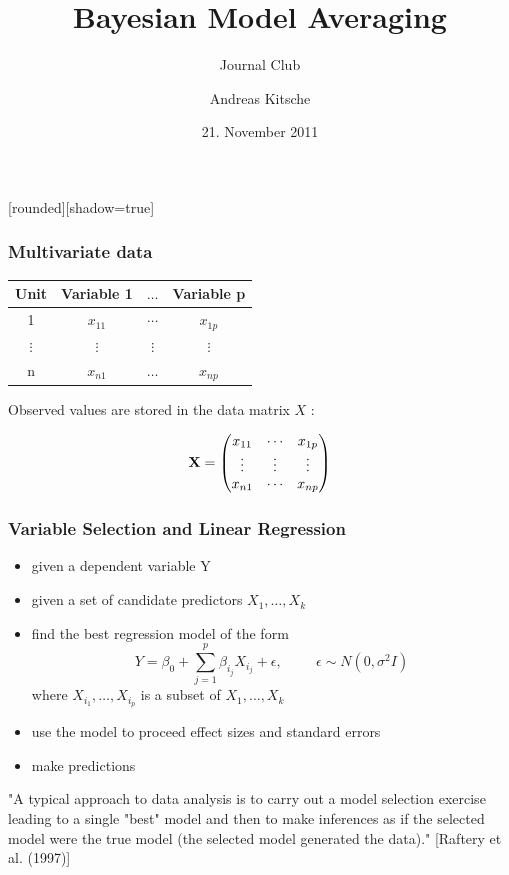 \documentclass[hyperref={pdfpagelabels=true}]{beamer}
\title{Bayesian Model Averaging}
\subtitle{Journal Club}
\institute[Institut für Biostatistik]{Institut für Biostatistik\\ \url{kitsche@biostat.uni-hannover.de}}
\author{Andreas Kitsche}
\date{21. November 2011}
\begin{document}

[rounded][shadow=true]
\addtocounter{framenumber}{-1}

\begin{frame}
\titlepage
\end{frame}






\begin{frame}
\frametitle{Multivariate data}
\begin{table}
	\centering
		\begin{tabular}{cccc} \hline
		Unit & Variable 1 & $\ldots$ & Variable p\\ \hline
		1 & $x_{11}$ & $\cdots$ & $x_{1p}$\\
		$\vdots$ & $\vdots$ & $\vdots$ & $\vdots$ \\
		n&$x_{n1}$ & $\ldots$ & $x_{np}$ \\ \hline
		\end{tabular}
\end{table}
Observed values are stored in the data matrix  \boldmath$X$ \unboldmath:

\begin{align*}
\bf X = \begin{pmatrix}
x_{11} &  \cdots & x_{1p}\\
\vdots & \vdots &\vdots  \\ 
x_{n1} & \cdots & x_{np}
\end{pmatrix}
\end{align*}

\nocite{Genell.2010}
\nocite{Raftery.1997}
\nocite{Hoeting.2000}
\nocite{Clyde.1999}
\nocite{PENROSE.1985}

\end{frame}

\begin{frame}
\frametitle{Variable Selection and Linear Regression}
\begin{itemize}
\item given a dependent variable Y
\item given a set of candidate predictors $X_{1},\ldots,X_{k}$
\item find the best regression model of the form
\[
Y = \beta_{0} + \sum_{j=1}^{p}\beta_{i_{j}}X_{i_{j}} + \epsilon, \hspace{1cm} \epsilon \sim N(0, \sigma^{2}I)
\]
where $X_{i_{1}},\ldots,X_{i_{p}}$ is a subset of $X_{1},\ldots,X_{k}$\\
\item use the model to proceed effect sizes and standard errors
\item make predictions
\end{itemize}
\vspace{0.5cm}
"A typical approach to data analysis is to carry out a
model selection exercise leading to a single "best" model
and then to make inferences as if the selected model were
the true model (the selected model generated the data)." [Raftery et al. (1997)]
\end{frame}
\end{document}
